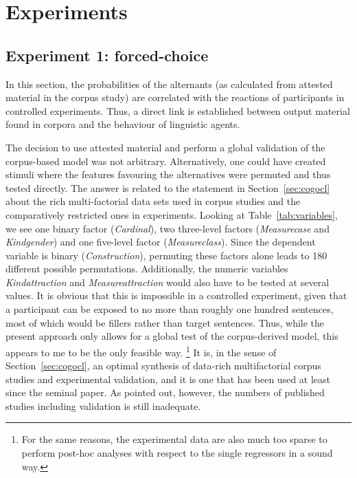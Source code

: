 \section{Experiments}
\label{sec:experimental}

\subsection{Experiment 1: forced-choice}
\label{sec:exp:fc}

In this section, the probabilities of the alternants (as calculated from attested material in the corpus study) are correlated with the reactions of participants in controlled experiments.
Thus, a direct link is established between output material found in corpora and the behaviour of linguistic agents.

The decision to use attested material and perform a global validation of the corpus-based model was not arbitrary.
Alternatively, one could have created stimuli where the features favouring the alternatives were permuted and thus tested directly.
The answer is related to the statement in Section~\ref{sec:cogocl} about the rich multi-factorial data sets used in corpus studies and the comparatively restricted ones in experiments.
Looking at Table~\ref{tab:variables}, we see one binary factor (\textit{Cardinal}), two three-level factors (\textit{Measurecase} and \textit{Kindgender}) and one five-level factor (\textit{Measureclass}).
Since the dependent variable is binary (\textit{Construction}), permuting these factors alone leads to 180 different possible permutations.
Additionally, the numeric variables \textit{Kindattraction} and \textit{Measureattraction} would also have to be tested at several values.
It is obvious that this is impossible in a controlled experiment, given that a participant can be exposed to no more than roughly one hundred sentences, most of which would be fillers rather than target sentences.
Thus, while the present approach only allows for a global test of the corpus-derived model, this appears to me to be the only feasible way.%
\footnote{For the same reasons, the experimental data are also much too sparse to perform post-hoc analyses with respect to the single regressors in a sound way.}
It is, in the sense of Section~\ref{sec:cogocl}, an optimal synthesis of data-rich multifactorial corpus studies and experimental validation, and it is one that has been used at least since the seminal \citet{BresnanEa2007} paper.
As \citet[3--4]{DivjakEa2016a} pointed out, however, the numbers of published studies including validation is still inadequate.

